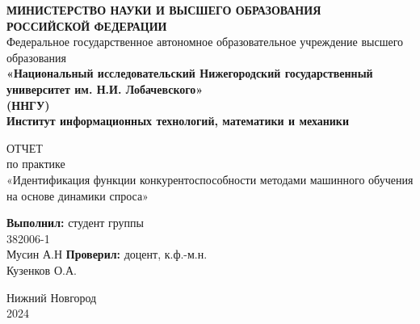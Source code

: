 \documentclass[14pt, a4paper]{extarticle}
\title{}
\author{}
\date{}
\begin{document}
  \begin{titlepage}
    \begin{center}
      {\bfseries МИНИСТЕРСТВО НАУКИ И ВЫСШЕГО ОБРАЗОВАНИЯ \\
        РОССИЙСКОЙ ФЕДЕРАЦИИ}
      \\
      Федеральное государственное автономное образовательное учреждение высшего образования
      \\
      {\bfseries «Национальный исследовательский Нижегородский государственный университет им. Н.И. Лобачевского»\\(ННГУ)
        \\Институт информационных технологий, математики и механики} \\
    \end{center}

    \vspace{8em}

    \begin{center}
      ОТЧЕТ \\ по практике \\
      «Идентификация функции конкурентоспособности методами машинного обучения на основе динамики спроса»
    \end{center}

    \vspace{5em}


    \begin{flushright}
      {\bfseries Выполнил:} студент группы\\382006-1\\Мусин А.Н \underline{\hspace{3cm}} \linebreak\linebreak\linebreak
      {\bfseries Проверил:} доцент, к.ф.-м.н.\\ Кузенков О.А.\underline{\hspace{3cm}} 
    \end{flushright}


    \vspace{\fill}

    \begin{center}
      Нижний Новгород\\2024
    \end{center}

  \end{titlepage}

  \tableofcontents
  \thispagestyle{empty}
  \newpage
\end{document}
